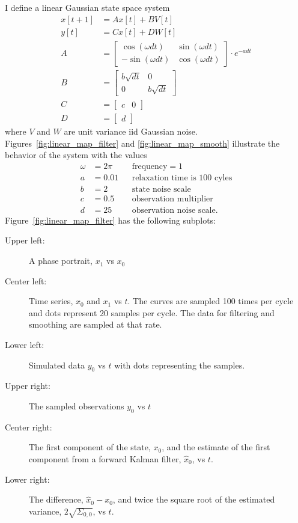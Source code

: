 \documentclass[12pt]{article}
\begin{document}
I define a linear Gaussian state space system
\begin{subequations}
  \label{eq:linear_map}
  \begin{align}
    \label{eq:linear_state_map}
    x[t+1] &= A x[t] + B V[t] \\
    y[t] &= C x[t] + D W[t] \\
    A &=
        \begin{bmatrix}
          \cos(\omega dt) & \sin(\omega dt)\\
          -\sin(\omega dt) & \cos(\omega dt)
        \end{bmatrix} \cdot e^{-a dt} \\
    B &=
        \begin{bmatrix}
          b\sqrt{dt} & 0 \\ 0 & b\sqrt{dt}
        \end{bmatrix} \\
    C &=
        \begin{bmatrix}
          c & 0
        \end{bmatrix}\\
    D &=
        \begin{bmatrix}
         d
        \end{bmatrix}
  \end{align}
\end{subequations}
where $V$ and $W$ are unit variance iid Gaussian noise.
Figures~\ref{fig:linear_map_filter} and \ref{fig:linear_map_smooth}
illustrate the behavior of the system with the values
\begin{align*}
  \omega &= 2\pi && \text{frequency} = 1\\
  a &= 0.01 && \text{relaxation time is 100 cyles}\\
  b &= 2 && \text{state noise scale} \\
  c &= 0.5 && \text{observation multiplier} \\
  d &= 25 && \text{observation noise scale}.
\end{align*}
Figure~\ref{fig:linear_map_filter} has the following subplots:
\begin{description}
\item[Upper left:] A phase portrait, $x_1$ vs $x_0$
\item[Center left:] Time series, $x_0$ and $x_1$ vs $t$.  The curves
  are sampled 100 times per cycle and dots represent 20 samples per
  cycle.
  The data for filtering and smoothing are sampled at that rate.
\item[Lower left:] Simulated data $y_0$ vs $t$ with dots representing
  the samples.
\item[Upper right:] The sampled observations $y_0$ vs $t$
\item[Center right:] The first component of the state, $x_0$, and the
  estimate of the first component from a forward Kalman filter,
  $\hat x_0$, vs $t$.
\item[Lower right:] The difference, $\hat x_0 - x_0$, and twice the
  square root of the estimated variance, $2\sqrt{\Sigma_{0,0}}$,
  vs $t$.
\end{description}
\end{document}
